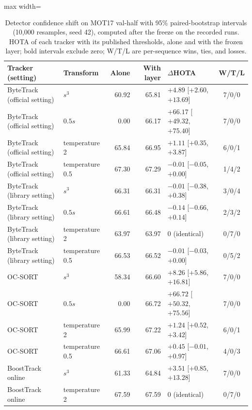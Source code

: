 \begin{table}[tbp]
\centering
\caption{Detector confidence shift on MOT17 val-half with 95\% paired-bootstrap intervals (10,000 resamples, seed 42), computed after the freeze on the recorded runs. HOTA of each tracker with its published thresholds, alone and with the frozen layer; bold intervals exclude zero; W/T/L are per-sequence wins, ties, and losses.}
\label{tab:ch5-shiftboot}
\small\setlength{\tabcolsep}{4pt}
\begin{adjustbox}{max width=\textwidth}
\begin{tabular}{llrrlc}
\hline
Tracker (setting) & Transform & Alone & With layer & $\Delta$HOTA & W/T/L \\
\hline
ByteTrack (official setting) & $s^3$ & 60.92 & 65.81 & {\boldmath $+4.89$ [$+2.60$, $+13.69$]} & 7/0/0 \\
ByteTrack (official setting) & $0.5s$ & 0.00 & 66.17 & {\boldmath $+66.17$ [$+49.32$, $+75.40$]} & 7/0/0 \\
ByteTrack (official setting) & temperature 2 & 65.84 & 66.95 & {\boldmath $+1.11$ [$+0.35$, $+3.87$]} & 6/0/1 \\
ByteTrack (official setting) & temperature 0.5 & 67.30 & 67.29 & $-0.01$ [$-0.05$, $+0.00$] & 1/4/2 \\
ByteTrack (library setting) & $s^3$ & 66.31 & 66.31 & $-0.01$ [$-0.38$, $+0.38$] & 3/0/4 \\
ByteTrack (library setting) & $0.5s$ & 66.61 & 66.48 & $-0.14$ [$-0.66$, $+0.14$] & 2/3/2 \\
ByteTrack (library setting) & temperature 2 & 63.97 & 63.97 & 0 (identical) & 0/7/0 \\
ByteTrack (library setting) & temperature 0.5 & 66.53 & 66.52 & $-0.01$ [$-0.03$, $+0.00$] & 0/5/2 \\
OC-SORT & $s^3$ & 58.34 & 66.60 & {\boldmath $+8.26$ [$+5.86$, $+16.81$]} & 7/0/0 \\
OC-SORT & $0.5s$ & 0.00 & 66.72 & {\boldmath $+66.72$ [$+50.32$, $+75.56$]} & 7/0/0 \\
OC-SORT & temperature 2 & 65.99 & 67.22 & {\boldmath $+1.24$ [$+0.52$, $+3.42$]} & 6/0/1 \\
OC-SORT & temperature 0.5 & 66.61 & 67.06 & $+0.45$ [$-0.01$, $+0.97$] & 4/0/3 \\
BoostTrack online & $s^3$ & 61.33 & 64.84 & {\boldmath $+3.51$ [$+0.85$, $+13.28$]} & 7/0/0 \\
BoostTrack online & temperature 2 & 67.59 & 67.59 & 0 (identical) & 0/7/0 \\
\hline
\end{tabular}
\end{adjustbox}
\end{table}
